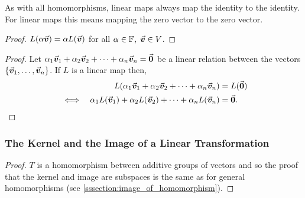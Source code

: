 \documentclass[../MathsNotesBase.tex]{subfiles}
\begin{document}
{		\begin{corollary}\label{coro:linear-maps-map-the-origin-to-itself}
			As with all homomorphisms, linear maps always map the identity to the identity. For linear maps this means mapping the zero vector to the zero vector.
		\end{corollary}
		
		\bigskip
		\begin{proof}
			${ L(\alpha \vec{\bm{v}}) = \alpha L(\vec{\bm{v}}) }$ for all ${ \alpha \in \mathbb{F}^{},\; \vec{\bm{v}} \in V }$.
		\end{proof}

		
		\medskip
		\begin{proof}
			Let ${ \alpha_1 \vec{\bm{v}}_1 + \alpha_2 \vec{\bm{v}}_2 + \cdots + \alpha_n \vec{\bm{v}}_n = \vec{\bm{0}} }$ be a linear relation between the vectors ${ \{\vec{\bm{v}}_1,\dots,\vec{\bm{v}}_n\} }$. If $L$ is a linear map then,
			\begin{align*}
				&& L(\alpha_1 \vec{\bm{v}}_1 + \alpha_2 \vec{\bm{v}}_2 + \cdots + \alpha_n \vec{\bm{v}}_n) &= L(\vec{\bm{0}}) \\
				&\iff & \alpha_1 L(\vec{\bm{v}}_1) + \alpha_2 L(\vec{\bm{v}}_2) + \cdots + \alpha_n L(\vec{\bm{v}}_n) &= \vec{\bm{0}}. \qedhere \\
			\end{align*}
		\end{proof}
		
		
		\biggerskip
		\subsubsection{The Kernel and the Image of a Linear Transformation}
		
		\medskip
		\begin{proof}
			$T$ is a homomorphism between additive groups of vectors and so the proof that the kernel and image are subspaces is the same as for general homomorphisms (see \ref{sssection:image_of_homomorphism}).
		\end{proof}
	
}
\end{document}
